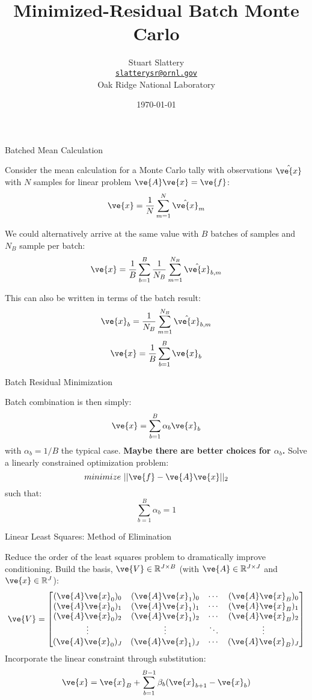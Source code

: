 \documentclass{beamer}
\author[Stuart Slattery]{Stuart Slattery\\
  \bigskip
  \href{mailto:slatterysr@ornl.gov}{\texttt{slatterysr@ornl.gov}} \\
  \bigskip
  Oak Ridge National Laboratory}
\date{\today}
\title[MRB Monte Carlo \hspace{1mm}
  \insertframenumber/\inserttotalframenumber]{Minimized-Residual Batch
Monte Carlo}
\begin{document}
\maketitle

\begin{frame}{Batched Mean Calculation}

  Consider the mean calculation for a Monte Carlo tally with
  observations $\hat{\ve{x}}$ with $N$ samples for linear problem
  $\ve{A}\ve{x}=\ve{f}$:
  \[
  \ve{x} = \frac{1}{N} \sum_{m=1}^N \hat{\ve{x}}_m
  \]

  We could alternatively arrive at the same value with $B$ batches of
  samples and $N_B$ sample per batch:
  \[
  \ve{x} = \frac{1}{B} \sum_{b=1}^B \frac{1}{N_B} \sum_{m=1}^{N_B}
  \hat{\ve{x}}_{b,m}
  \]

  This can also be written in terms of the batch result:
  \[
  \ve{x}_b=\frac{1}{N_B} \sum_{m=1}^{N_B} \hat{\ve{x}}_{b,m}
  \]
  \[
  \ve{x} = \frac{1}{B}\sum_{b=1}^B \ve{x}_b
  \]

\end{frame}

\begin{frame}{Batch Residual Minimization}

  Batch combination is then simply:
  \[
  \ve{x} = \sum_{b=1}^B \alpha_b \ve{x}_b
  \]
  with $\alpha_b = 1/B$ the typical case. \textbf{Maybe there are
    better choices for $\alpha_b$.} Solve a linearly constrained
  optimization problem:
  \[
  minimize\ ||\ve{f} - \ve{A}\ve{x}||_2
  \]
  such that:
  \[
  \sum_{b=1}^B \alpha_b = 1
  \]

\end{frame}

\begin{frame}{Linear Least Squares: Method of Elimination}

  Reduce the order of the least squares problem to dramatically
  improve conditioning. Build the basis, $\ve{V} \in \mathbb{R}^{J
    \times B}$ (with $\ve{A} \in \mathbb{R}^{J \times J}$ and $\ve{x}
  \in \mathbb{R}^{J}$):
  \[
  \ve{V} = 
  \begin{bmatrix}
    (\ve{A}\ve{x}_0)_0 & (\ve{A}\ve{x}_1)_0 & \cdots & (\ve{A}\ve{x}_B)_0 \\
    (\ve{A}\ve{x}_0)_1 & (\ve{A}\ve{x}_1)_1 & \cdots & (\ve{A}\ve{x}_B)_1 \\
    (\ve{A}\ve{x}_0)_2 & (\ve{A}\ve{x}_1)_2 & \cdots & (\ve{A}\ve{x}_B)_2 \\
    \vdots             & \vdots            & \ddots & \vdots \\
    (\ve{A}\ve{x}_0)_J & (\ve{A}\ve{x}_1)_J & \cdots & (\ve{A}\ve{x}_B)_J \\
  \end{bmatrix}
  \]
  Incorporate the linear constraint through substitution:
  \[
  \ve{x} = \ve{x}_B + \sum_{b=1}^{B-1} \beta_b (\ve{x}_{b+1} - \ve{x}_b)
  \]
  
\end{frame}
\end{document}
